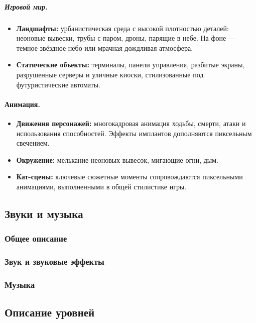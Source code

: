 \documentclass{article}
\begin{document}
\begin{itemize}
\subparagraph{Игровой мир.}
\begin{itemize}
    \item \textbf{Ландшафты:} урбанистическая среда с высокой плотностью деталей: неоновые вывески, трубы с паром, дроны, парящие в небе. На фоне — темное звёздное небо или мрачная дождливая атмосфера.
    \item \textbf{Статические объекты:} терминалы, панели управления, разбитые экраны, разрушенные серверы и уличные киоски, стилизованные под футуристические автоматы.
\end{itemize}

\paragraph{Анимация.}
\begin{itemize}
    \item \textbf{Движения персонажей:} многокадровая анимация ходьбы, смерти, атаки и использования способностей. Эффекты имплантов дополняются пиксельным свечением.
    \item \textbf{Окружение:} мелькание неоновых вывесок, мигающие огни, дым.
    \item \textbf{Кат-сцены:} ключевые сюжетные моменты сопровождаются пиксельными анимациями, выполненными в общей стилистике игры.
\end{itemize}

\subsection{Звуки и музыка}

\subsubsection{Общее описание}

\subsubsection{Звук и звуковые эффекты}

\subsubsection{Музыка}

\subsection{Описание уровней}


\end{itemize}
\end{document}
